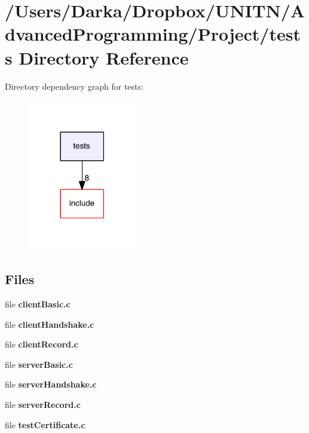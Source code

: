\section{/\+Users/\+Darka/\+Dropbox/\+U\+N\+I\+T\+N/\+Advanced\+Programming/\+Project/tests Directory Reference}
\label{dir_59425e443f801f1f2fd8bbe4959a3ccf}
Directory dependency graph for tests\+:\nopagebreak
\begin{figure}[H]
\begin{center}
\leavevmode
\includegraphics[width=134pt]{dir_59425e443f801f1f2fd8bbe4959a3ccf_dep}
\end{center}
\end{figure}
\subsection*{Files}
\begin{DoxyCompactItemize}
\item 
file {\bf client\+Basic.\+c}
\item 
file {\bf client\+Handshake.\+c}
\item 
file {\bf client\+Record.\+c}
\item 
file {\bf server\+Basic.\+c}
\item 
file {\bf server\+Handshake.\+c}
\item 
file {\bf server\+Record.\+c}
\item 
file {\bf test\+Certificate.\+c}
\end{DoxyCompactItemize}

